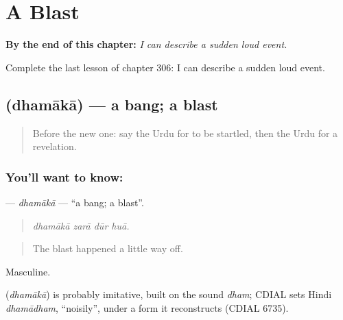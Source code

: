 
\chapter{A Blast}
\label{ch:ur-a-blast}

\begin{chapteropening}
\textbf{By the end of this chapter:} \emph{I can describe a sudden loud event.}

Complete the last lesson of chapter 306: I can describe a sudden loud event.
\end{chapteropening}

\section[\texorpdfstring{\ur{دھماکا} (dhamākā)}{دھماکا (dhamākā)}]{ (dhamākā) — a bang; a blast}

\label{lesson:UR-C306-dhamaka}



\begin{quote}
Before the new one: say the Urdu for to be startled, then the Urdu for a revelation.
\end{quote}

\subsection*{You'll want to know: }
\textbf{} — \emph{dhamākā} — \textquotedblleft{}a bang; a blast\textquotedblright{}.

\begin{quote}
   
\end{quote}

\begin{quote}
\emph{dhamākā zarā dūr huā.}
\end{quote}

\begin{quote}
The blast happened a little way off.
\end{quote}

Masculine.

\begin{cousinweb}
\textbf{} (\emph{dhamākā}) is probably imitative, built on the sound \emph{dham}; CDIAL sets Hindi \emph{dhamādham}, \textquotedblleft{}noisily\textquotedblright{}, under a form it reconstructs (CDIAL 6735).
\end{cousinweb}

